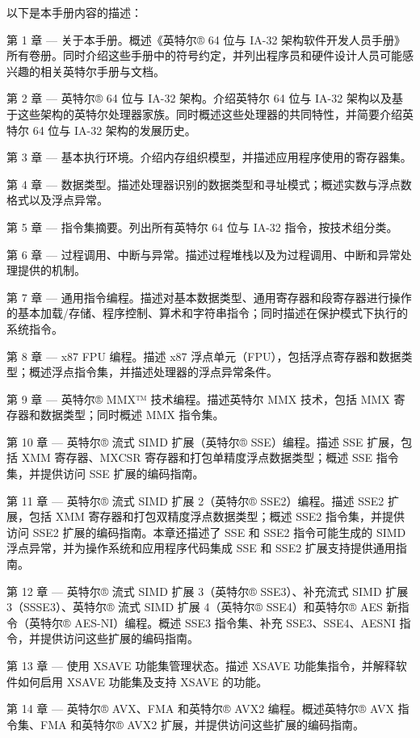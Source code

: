 \documentclass{article}
\begin{document}
以下是本手册内容的描述：

第 1 章 — 关于本手册。概述《英特尔® 64 位与 IA-32 架构软件开发人员手册》所有卷册。同时介绍这些手册中的符号约定，并列出程序员和硬件设计人员可能感兴趣的相关英特尔手册与文档。

第 2 章 — 英特尔® 64 位与 IA-32 架构。介绍英特尔 64 位与 IA-32 架构以及基于这些架构的英特尔处理器家族。同时概述这些处理器的共同特性，并简要介绍英特尔 64 位与 IA-32 架构的发展历史。

第 3 章 — 基本执行环境。介绍内存组织模型，并描述应用程序使用的寄存器集。

第 4 章 — 数据类型。描述处理器识别的数据类型和寻址模式；概述实数与浮点数格式以及浮点异常。

第 5 章 — 指令集摘要。列出所有英特尔 64 位与 IA-32 指令，按技术组分类。

第 6 章 — 过程调用、中断与异常。描述过程堆栈以及为过程调用、中断和异常处理提供的机制。

第 7 章 — 通用指令编程。描述对基本数据类型、通用寄存器和段寄存器进行操作的基本加载/存储、程序控制、算术和字符串指令；同时描述在保护模式下执行的系统指令。

第 8 章 — x87 FPU 编程。描述 x87 浮点单元（FPU），包括浮点寄存器和数据类型；概述浮点指令集，并描述处理器的浮点异常条件。

第 9 章 — 英特尔® MMX™ 技术编程。描述英特尔 MMX 技术，包括 MMX 寄存器和数据类型；同时概述 MMX 指令集。

第 10 章 — 英特尔® 流式 SIMD 扩展（英特尔® SSE）编程。描述 SSE 扩展，包括 XMM 寄存器、MXCSR 寄存器和打包单精度浮点数据类型；概述 SSE 指令集，并提供访问 SSE 扩展的编码指南。

第 11 章 — 英特尔® 流式 SIMD 扩展 2（英特尔® SSE2）编程。描述 SSE2 扩展，包括 XMM 寄存器和打包双精度浮点数据类型；概述 SSE2 指令集，并提供访问 SSE2 扩展的编码指南。本章还描述了 SSE 和 SSE2 指令可能生成的 SIMD 浮点异常，并为操作系统和应用程序代码集成 SSE 和 SSE2 扩展支持提供通用指南。

第 12 章 — 英特尔® 流式 SIMD 扩展 3（英特尔® SSE3）、补充流式 SIMD 扩展 3（SSSE3）、英特尔® 流式 SIMD 扩展 4（英特尔® SSE4）和英特尔® AES 新指令（英特尔® AES-NI）编程。概述 SSE3 指令集、补充 SSE3、SSE4、AESNI 指令，并提供访问这些扩展的编码指南。

第 13 章 — 使用 XSAVE 功能集管理状态。描述 XSAVE 功能集指令，并解释软件如何启用 XSAVE 功能集及支持 XSAVE 的功能。

第 14 章 — 英特尔® AVX、FMA 和英特尔® AVX2 编程。概述英特尔® AVX 指令集、FMA 和英特尔® AVX2 扩展，并提供访问这些扩展的编码指南。
\end{document}
